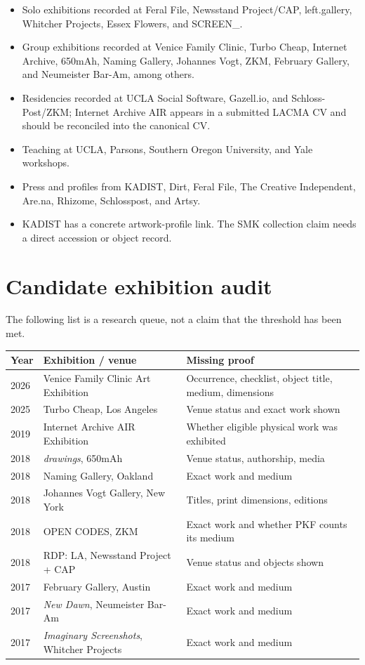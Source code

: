 \documentclass[11pt,letterpaper]{article}
\begin{document}
\begin{itemize}
\item Solo exhibitions recorded at Feral File, Newsstand Project/CAP, left.gallery, Whitcher Projects, Essex Flowers, and SCREEN\_.
\item Group exhibitions recorded at Venice Family Clinic, Turbo Cheap, Internet Archive, 650mAh, Naming Gallery, Johannes Vogt, ZKM, February Gallery, and Neumeister Bar-Am, among others.
\item Residencies recorded at UCLA Social Software, Gazell.io, and Schloss-Post/ZKM; Internet Archive AIR appears in a submitted LACMA CV and should be reconciled into the canonical CV.
\item Teaching at UCLA, Parsons, Southern Oregon University, and Yale workshops.
\item Press and profiles from KADIST, Dirt, Feral File, The Creative Independent, Are.na, Rhizome, Schlosspost, and Artsy.
\item KADIST has a concrete artwork-profile link. The SMK collection claim needs a direct accession or object record.
\end{itemize}

\clearpage
\section{Candidate exhibition audit}

The following list is a research queue, not a claim that the threshold has been met.

\small
\begin{tabularx}{\textwidth}{p{}p{}X}
\toprule
Year & Exhibition / venue & Missing proof \\
\midrule
2026 & Venice Family Clinic Art Exhibition & Occurrence, checklist, object title, medium, dimensions \\
2025 & Turbo Cheap, Los Angeles & Venue status and exact work shown \\
2019 & Internet Archive AIR Exhibition & Whether eligible physical work was exhibited \\
2018 & \textit{drawings}, 650mAh & Venue status, authorship, media \\
2018 & Naming Gallery, Oakland & Exact work and medium \\
2018 & Johannes Vogt Gallery, New York & Titles, print dimensions, editions \\
2018 & OPEN CODES, ZKM & Exact work and whether PKF counts its medium \\
2018 & RDP: LA, Newsstand Project + CAP & Venue status and objects shown \\
2017 & February Gallery, Austin & Exact work and medium \\
2017 & \textit{New Dawn}, Neumeister Bar-Am & Exact work and medium \\
2017 & \textit{Imaginary Screenshots}, Whitcher Projects & Exact work and medium \\
\bottomrule
\end{tabularx}
\normalsize
\end{document}
